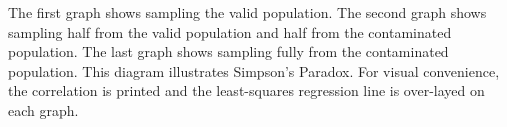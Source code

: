 \hspace{24pt} The first graph shows sampling the valid population. The second graph shows sampling half from the valid population and half from the contaminated population. The last graph shows sampling fully from the contaminated population. This diagram illustrates Simpson's Paradox. For visual convenience, the correlation is printed and the least-squares regression line is over-layed on each graph.
